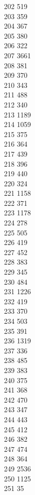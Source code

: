 { 202	519 \\
 203	359 \\
 204	367 \\
 205	380 \\
 206	322 \\
 207	3661 \\
 208	381 \\
 209	370 \\
 210	343 \\
 211	488 \\
 212	340 \\
 213	1189 \\
 214	1059 \\
 215	375 \\
 216	364 \\
 217	439 \\
 218	396 \\
 219	440 \\
 220	324 \\
 221	1158 \\
 222	371 \\
 223	1178 \\
 224	278 \\
 225	505 \\
 226	419 \\
 227	452 \\
 228	383 \\
 229	345 \\
 230	484 \\
 231	1226 \\
 232	419 \\
 233	370 \\
 234	503 \\
 235	391 \\
 236	1319 \\
 237	336 \\
 238	485 \\
 239	383 \\
 240	375 \\
 241	368 \\
 242	470 \\
 243	347 \\
 244	443 \\
 245	412 \\
 246	382 \\
 247	474 \\
 248	364 \\
 249	2536 \\
 250	1125 \\
 251	35 \\
}
